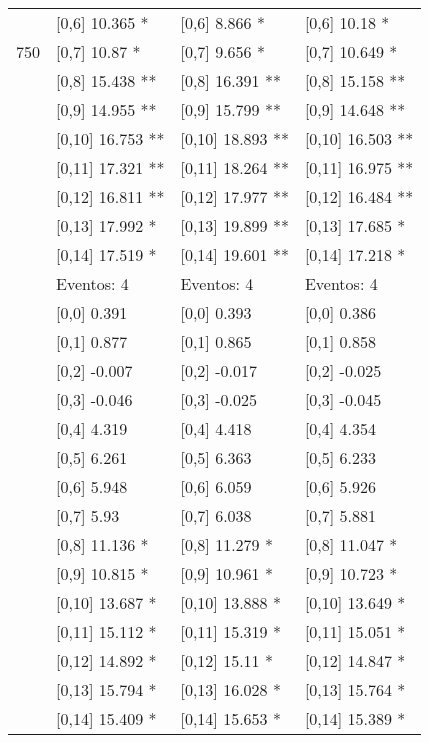 \begin{table}
\begin{tabular}[t]{llll}
 & {}[0,6] 10.365 * & {}[0,6] 8.866 * & {}[0,6] 10.18 *\\
750 & {}[0,7] 10.87 * & {}[0,7] 9.656 * & {}[0,7] 10.649 *\\
\addlinespace
 & {}[0,8] 15.438 ** & {}[0,8] 16.391 ** & {}[0,8] 15.158 **\\
 & {}[0,9] 14.955 ** & {}[0,9] 15.799 ** & {}[0,9] 14.648 **\\
 & {}[0,10] 16.753 ** & {}[0,10] 18.893 ** & {}[0,10] 16.503 **\\
 & {}[0,11] 17.321 ** & {}[0,11] 18.264 ** & {}[0,11] 16.975 **\\
 & {}[0,12] 16.811 ** & {}[0,12] 17.977 ** & {}[0,12] 16.484 **\\
\addlinespace
 & {}[0,13] 17.992 * & {}[0,13] 19.899 ** & {}[0,13] 17.685 *\\
 & {}[0,14] 17.519 * & {}[0,14] 19.601 ** & {}[0,14] 17.218 *\\
 & Eventos:  4 & Eventos:  4 & Eventos:  4\\
 & {}[0,0] 0.391 & {}[0,0] 0.393 & {}[0,0] 0.386\\
 & {}[0,1] 0.877 & {}[0,1] 0.865 & {}[0,1] 0.858\\
\addlinespace
 & {}[0,2] -0.007 & {}[0,2] -0.017 & {}[0,2] -0.025\\
 & {}[0,3] -0.046 & {}[0,3] -0.025 & {}[0,3] -0.045\\
 & {}[0,4] 4.319 & {}[0,4] 4.418 & {}[0,4] 4.354\\
 & {}[0,5] 6.261 & {}[0,5] 6.363 & {}[0,5] 6.233\\
 & {}[0,6] 5.948 & {}[0,6] 6.059 & {}[0,6] 5.926\\
\addlinespace
1000 & {}[0,7] 5.93 & {}[0,7] 6.038 & {}[0,7] 5.881\\
 & {}[0,8] 11.136 * & {}[0,8] 11.279 * & {}[0,8] 11.047 *\\
 & {}[0,9] 10.815 * & {}[0,9] 10.961 * & {}[0,9] 10.723 *\\
 & {}[0,10] 13.687 * & {}[0,10] 13.888 * & {}[0,10] 13.649 *\\
 & {}[0,11] 15.112 * & {}[0,11] 15.319 * & {}[0,11] 15.051 *\\
\addlinespace
 & {}[0,12] 14.892 * & {}[0,12] 15.11 * & {}[0,12] 14.847 *\\
 & {}[0,13] 15.794 * & {}[0,13] 16.028 * & {}[0,13] 15.764 *\\
 & {}[0,14] 15.409 * & {}[0,14] 15.653 * & {}[0,14] 15.389 *\\
\bottomrule
\end{tabular}
\end{table}
